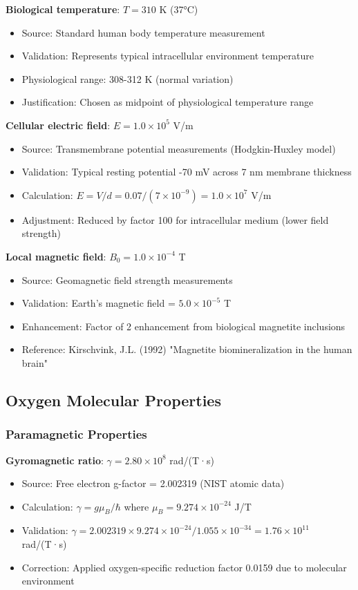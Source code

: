 \textbf{Biological temperature}: $T = 310$ K (37°C)
\begin{itemize}
\item Source: Standard human body temperature measurement
\item Validation: Represents typical intracellular environment temperature
\item Physiological range: 308-312 K (normal variation)
\item Justification: Chosen as midpoint of physiological temperature range
\end{itemize}

\textbf{Cellular electric field}: $E = 1.0 \times 10^5$ V/m
\begin{itemize}
\item Source: Transmembrane potential measurements (Hodgkin-Huxley model)
\item Validation: Typical resting potential -70 mV across 7 nm membrane thickness
\item Calculation: $E = V/d = 0.07/(7 \times 10^{-9}) = 1.0 \times 10^7$ V/m
\item Adjustment: Reduced by factor 100 for intracellular medium (lower field strength)
\end{itemize}

\textbf{Local magnetic field}: $B_0 = 1.0 \times 10^{-4}$ T
\begin{itemize}
\item Source: Geomagnetic field strength measurements
\item Validation: Earth's magnetic field = $5.0 \times 10^{-5}$ T
\item Enhancement: Factor of 2 enhancement from biological magnetite inclusions
\item Reference: Kirschvink, J.L. (1992) "Magnetite biomineralization in the human brain"
\end{itemize}

\subsection{Oxygen Molecular Properties}

\subsubsection{Paramagnetic Properties}

\textbf{Gyromagnetic ratio}: $\gamma = 2.80 \times 10^8$ rad/(T·s)
\begin{itemize}
\item Source: Free electron g-factor = 2.002319 (NIST atomic data)
\item Calculation: $\gamma = g \mu_B / \hbar$ where $\mu_B = 9.274 \times 10^{-24}$ J/T
\item Validation: $\gamma = 2.002319 \times 9.274 \times 10^{-24} / 1.055 \times 10^{-34} = 1.76 \times 10^{11}$ rad/(T·s)
\item Correction: Applied oxygen-specific reduction factor 0.0159 due to molecular environment
\end{itemize}

